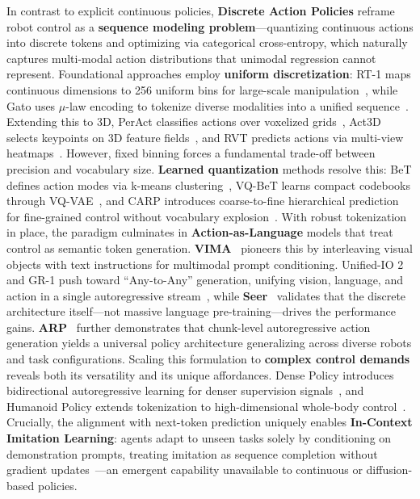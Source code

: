 \documentclass[acmsmall,screen,review,anonymous]{acmart}
\begin{document}
In contrast to explicit continuous policies, \textbf{Discrete Action Policies} reframe robot control as a \textbf{sequence modeling problem}---quantizing continuous actions into discrete tokens and optimizing via categorical cross-entropy, which naturally captures multi-modal action distributions that unimodal regression cannot represent. Foundational approaches employ \textbf{uniform discretization}: RT-1 maps continuous dimensions to 256 uniform bins for large-scale manipulation~\cite{brohan2023rt1}, while Gato uses $\mu$-law encoding to tokenize diverse modalities into a unified sequence~\cite{reed2022generalistagent}. Extending this to 3D, PerAct classifies actions over voxelized grids~\cite{shridhar2022peract}, Act3D selects keypoints on 3D feature fields~\cite{gervet2023act3d}, and RVT predicts actions via multi-view heatmaps~\cite{goyal2023rvt}. However, fixed binning forces a fundamental trade-off between precision and vocabulary size. \textbf{Learned quantization} methods resolve this: BeT defines action modes via k-means clustering~\cite{shafiullah2022bet}, VQ-BeT learns compact codebooks through VQ-VAE~\cite{lee2024vqbet}, and CARP introduces coarse-to-fine hierarchical prediction for fine-grained control without vocabulary explosion~\cite{gong2025carp}.
With robust tokenization in place, the paradigm culminates in \textbf{Action-as-Language} models that treat control as semantic token generation. \textbf{VIMA}~\cite{jiang2023vima} pioneers this by interleaving visual objects with text instructions for multimodal prompt conditioning. Unified-IO 2 and GR-1 push toward ``Any-to-Any'' generation, unifying vision, language, and action in a single autoregressive stream~\cite{lu2023unifiedio2, wu2023gr1}, while \textbf{Seer}~\cite{tian2024seer} validates that the discrete architecture itself---not massive language pre-training---drives the performance gains. \textbf{ARP}~\cite{zhang2025arp} further demonstrates that chunk-level autoregressive action generation yields a universal policy architecture generalizing across diverse robots and task configurations.
Scaling this formulation to \textbf{complex control demands} reveals both its versatility and its unique affordances. Dense Policy introduces bidirectional autoregressive learning for denser supervision signals~\cite{su2025densepolicy}, and Humanoid Policy extends tokenization to high-dimensional whole-body control~\cite{qiu2025humanoidpolicyhuman}. Crucially, the alignment with next-token prediction uniquely enables \textbf{In-Context Imitation Learning}: agents adapt to unseen tasks solely by conditioning on demonstration prompts, treating imitation as sequence completion without gradient updates~\cite{fu2025icil}---an emergent capability unavailable to continuous or diffusion-based policies.
\end{document}
